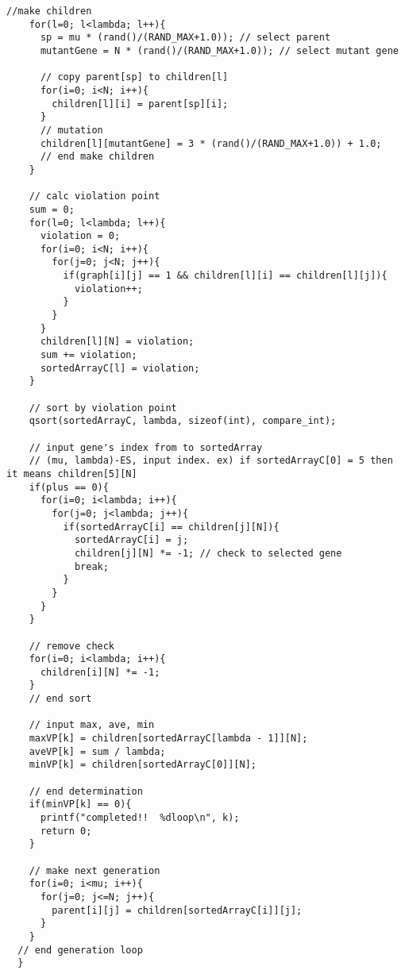 \documentclass[a4j]{jarticle}
\begin{document}
\begin{lstlisting}[caption=ES.c, label=ES.c, xleftmargin=1cm]
    //make children
    for(l=0; l<lambda; l++){
      sp = mu * (rand()/(RAND_MAX+1.0)); // select parent
      mutantGene = N * (rand()/(RAND_MAX+1.0)); // select mutant gene
      
      // copy parent[sp] to children[l]
      for(i=0; i<N; i++){
        children[l][i] = parent[sp][i];
      }
      // mutation
      children[l][mutantGene] = 3 * (rand()/(RAND_MAX+1.0)) + 1.0;
      // end make children
    }
    
    // calc violation point
    sum = 0;
    for(l=0; l<lambda; l++){
      violation = 0;
      for(i=0; i<N; i++){      
        for(j=0; j<N; j++){
          if(graph[i][j] == 1 && children[l][i] == children[l][j]){
            violation++;
          }        
        }
      }
      children[l][N] = violation;
      sum += violation;
      sortedArrayC[l] = violation;
    }

    // sort by violation point
    qsort(sortedArrayC, lambda, sizeof(int), compare_int);

    // input gene's index from to sortedArray
    // (mu, lambda)-ES, input index. ex) if sortedArrayC[0] = 5 then it means children[5][N] 
    if(plus == 0){
      for(i=0; i<lambda; i++){
        for(j=0; j<lambda; j++){
          if(sortedArrayC[i] == children[j][N]){
            sortedArrayC[i] = j;
            children[j][N] *= -1; // check to selected gene
            break;
          }
        }
      }
    }

    // remove check
    for(i=0; i<lambda; i++){
      children[i][N] *= -1;
    }
    // end sort

    // input max, ave, min
    maxVP[k] = children[sortedArrayC[lambda - 1]][N];
    aveVP[k] = sum / lambda;
    minVP[k] = children[sortedArrayC[0]][N];

    // end determination
    if(minVP[k] == 0){
      printf("completed!!  %dloop\n", k);
      return 0;
    }

    // make next generation
    for(i=0; i<mu; i++){
      for(j=0; j<=N; j++){
        parent[i][j] = children[sortedArrayC[i]][j];
      }
    }
  // end generation loop
  }

\end{lstlisting}
\end{document}
